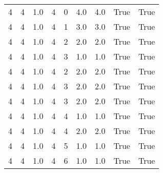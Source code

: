 \documentclass[a4paper,12pt]{article}
\begin{document}
\begin{center}
\begin{tabular}{ c c c | c c c | c | c | c}
        4 & 4 & 1.0 & 4 & 0 & 4.0 & 4.0 & True & True     \\
        4 & 4 & 1.0 & 4 & 1 & 3.0 & 3.0 & True & True     \\
        4 & 4 & 1.0 & 4 & 2 & 2.0 & 2.0 & True & True     \\
        4 & 4 & 1.0 & 4 & 3 & 1.0 & 1.0 & True & True     \\
        4 & 4 & 1.0 & 4 & 2 & 2.0 & 2.0 & True & True     \\
        4 & 4 & 1.0 & 4 & 3 & 2.0 & 2.0 & True & True     \\
        4 & 4 & 1.0 & 4 & 3 & 2.0 & 2.0 & True & True     \\
        4 & 4 & 1.0 & 4 & 4 & 1.0 & 1.0 & True & True     \\
        4 & 4 & 1.0 & 4 & 4 & 2.0 & 2.0 & True & True     \\
        4 & 4 & 1.0 & 4 & 5 & 1.0 & 1.0 & True & True     \\
        4 & 4 & 1.0 & 4 & 6 & 1.0 & 1.0 & True & True     \\
    \end{tabular}
\end{center}
\end{document}

